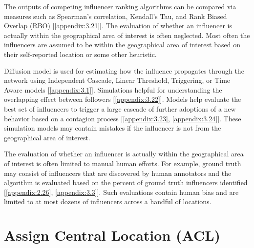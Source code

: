 
The outputs of competing influencer ranking algorithms can be compared via measures such as Spearman's correlation, Kendall's Tau, and Rank Biased Overlap (RBO) [\ref{appendix:3.21}]. The evaluation of whether an influencer is actually within the geographical area of interest is often neglected. Most often the influencers are assumed to be within the geographical area of interest based on their self-reported location or some other heuristic. 

Diffusion model is used for estimating how the influence propagates through the network using Independent Cascade, Linear Threshold, Triggering, or Time Aware models [\ref{appendix:3.1}]. Simulations helpful for understanding the overlapping effect between followers [\ref{appendix:3.22}]. Models help evaluate the best set of influencers to trigger a large cascade of further adoptions of a new behavior based on a contagion process [\ref{appendix:3.23}, \ref{appendix:3.24}]. These simulation models may contain mistakes if the influencer is not from the geographical area of interest. 

The evaluation of whether an influencer is actually within the geographical area of interest is often limited to manual human efforts. For example, ground truth may consist of influencers that are discovered by human annotators and the algorithm is evaluated based on the percent of ground truth influencers identified [\ref{appendix:2.26}, \ref{appendix:3.3}]. Such evaluations contain human bias and are limited to at most dozens of influencers across a handful of locations.

\section{Assign Central Location (ACL)}

